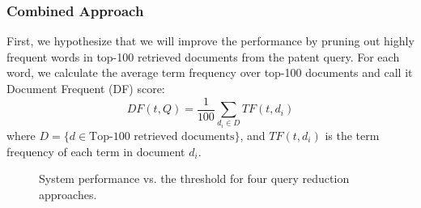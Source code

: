 \subsubsection{Combined Approach}
First, we hypothesize that we will improve the performance by pruning out highly frequent words in top-100 retrieved documents from the patent query. For each word, we calculate the average term frequency over top-100 documents and call it Document Frequent (DF) score:
\begin{equation}
 DF(t, Q)=\frac{1}{100}\sum_{d_i\in  D} TF(t, d_i)    
 \label{eq:df}
\end{equation}
where $D=\{d\in \mbox{Top-100 retrieved documents}\}$, and $TF(t, d_i)$ is the term frequency of each term in document $d_i$.
\begin{figure}[t!]
\begin{centering}
 \hspace*{1.5cm}  
\par\end{centering} 
\protect\caption{System performance vs. the threshold for four query reduction approaches.}
\label{fig:combinedapproach}
\end{figure}

